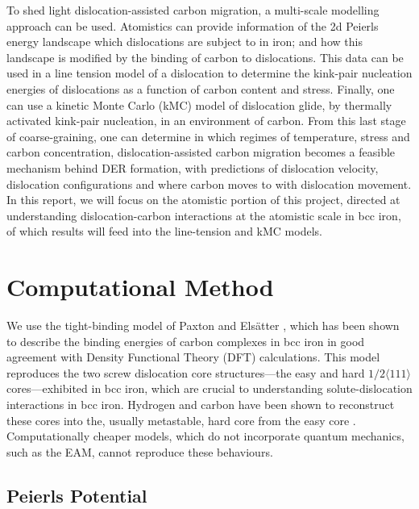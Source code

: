 \documentclass[a4paper,11pt]{article}
\begin{document}
To shed light dislocation-assisted carbon migration, a multi-scale modelling approach can be
used. Atomistics can provide information of the 2d Peierls energy landscape which dislocations are
subject to in iron; and how this landscape is modified by the binding of carbon to
dislocations. This data can be used in a line tension model of a dislocation to determine the
kink-pair nucleation energies of dislocations as a function of carbon content and stress. Finally,
one can use a kinetic Monte Carlo (kMC) model of dislocation glide, by thermally activated kink-pair
nucleation, in an environment of carbon. From this last stage of coarse-graining, one can
determine in which regimes of temperature, stress and carbon concentration, dislocation-assisted
carbon migration becomes a feasible mechanism behind DER formation, with predictions of
dislocation velocity, dislocation configurations and where carbon moves to with dislocation
movement. In this report, we will focus on the atomistic portion of this project, directed at
understanding dislocation-carbon interactions at the atomistic scale in bcc iron, of which results will feed
into the line-tension and kMC models.







\section{Computational Method}
\label{sec:org188b294}

We use the tight-binding model of Paxton and Elsätter \cite{Paxton2013}, which has been shown to
describe the binding energies of carbon complexes in bcc iron in good agreement with Density
Functional Theory (DFT) calculations. This model reproduces the two screw dislocation core
structures---the easy and hard \(1/2\langle 111 \rangle\) cores---exhibited in bcc iron, which are crucial to
understanding solute-dislocation interactions in bcc iron. Hydrogen and carbon have been shown to
reconstruct these cores into the, usually metastable, hard core from the easy core
\cite{Ventelon2015,itakura13_effec_hydrog_atoms_screw_disloc}. Computationally cheaper models, which
do not incorporate quantum mechanics, such as the EAM, cannot reproduce these behaviours.

\subsection{Peierls Potential}
\label{sec:orge30be52}
\end{document}

